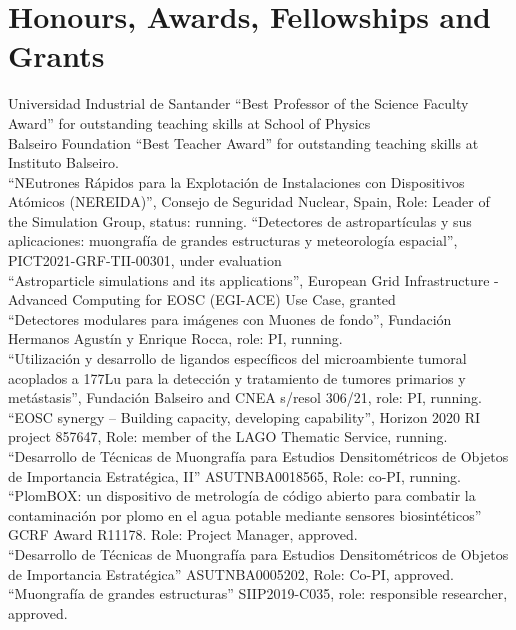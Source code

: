\ifeng
\section*{Honours, Awards, Fellowships and Grants}
\noindent
{} Universidad Industrial de Santander ``Best Professor of the Science Faculty Award'' for outstanding teaching skills at School of Physics\\
 Balseiro Foundation ``Best Teacher Award'' for outstanding teaching skills at Instituto Balseiro.\\
 ``NEutrones Rápidos para la Explotación de Instalaciones con Dispositivos Atómicos (NEREIDA)'', Consejo de Seguridad Nuclear, Spain, Role: Leader of the Simulation Group, status: running.
 ``Detectores de astropartículas y sus aplicaciones: muongrafía de grandes estructuras y meteorología espacial'', PICT2021-GRF-TII-00301, under evaluation\\
 ``Astroparticle simulations and its applications'', European Grid Infrastructure - Advanced Computing for EOSC (EGI-ACE) Use Case, granted\\
 ``Detectores modulares para imágenes con Muones de fondo'', Fundación Hermanos Agustín y Enrique Rocca, role: PI, running.\\
 ``Utilización y desarrollo de ligandos específicos del microambiente tumoral acoplados a 177Lu para la detección y tratamiento de tumores primarios y metástasis'', Fundación Balseiro and CNEA s/resol 306/21, role: PI, running.\\
 ``EOSC synergy – Building capacity, developing capability'', Horizon 2020 RI project 857647, Role: member of the LAGO Thematic Service, running.\\
 ``Desarrollo de Técnicas de Muongrafía para Estudios Densitométricos de Objetos de Importancia Estratégica, II'' ASUTNBA0018565, Role: co-PI, running.\\
 ``PlomBOX: un dispositivo de metrología de código abierto para combatir la contaminación por plomo en el agua potable mediante sensores biosintéticos'' GCRF Award R11178. Role: Project Manager, approved.\\
 ``Desarrollo de Técnicas de Muongrafía para Estudios Densitométricos de Objetos de Importancia Estratégica'' ASUTNBA0005202, Role: Co-PI, approved.\\
 ``Muongrafía de grandes estructuras'' SIIP2019-C035, role: responsible researcher, approved.\\
